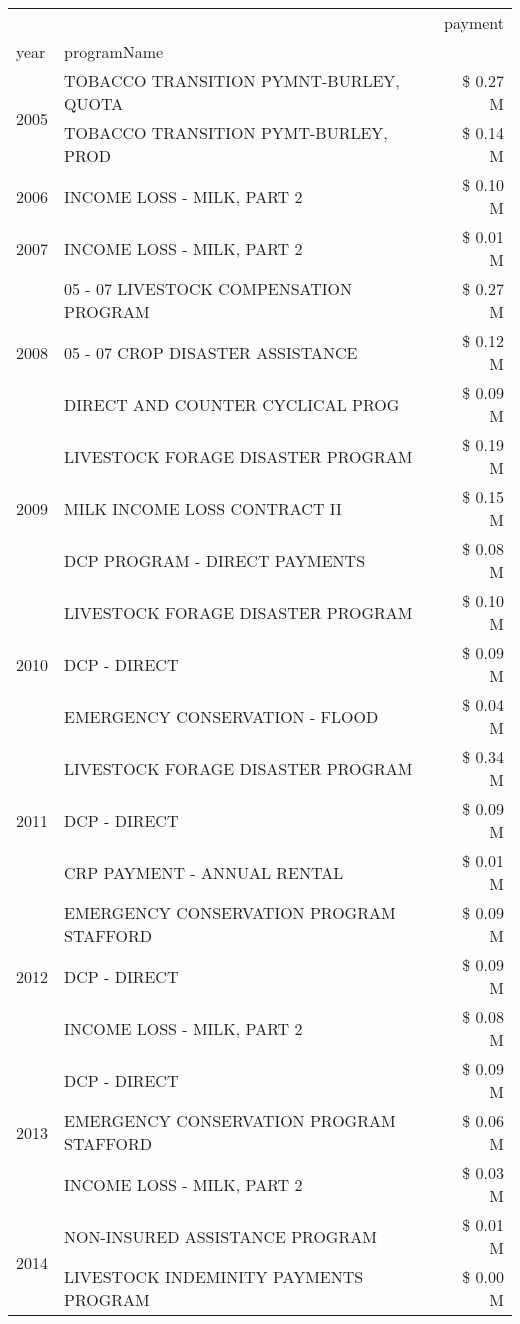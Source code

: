 \begin{tabular}{llr}
\toprule
 &  & payment \\
year & programName &  \\
\midrule
\multirow[t]{2}{*}{2005} & TOBACCO TRANSITION PYMNT-BURLEY, QUOTA & \$ 0.27 M \\
 & TOBACCO TRANSITION PYMT-BURLEY, PROD & \$ 0.14 M \\
\cline{1-3}
2006 & INCOME LOSS - MILK, PART 2 & \$ 0.10 M \\
\cline{1-3}
2007 & INCOME LOSS - MILK, PART 2 & \$ 0.01 M \\
\cline{1-3}
\multirow[t]{3}{*}{2008} & 05 - 07 LIVESTOCK COMPENSATION PROGRAM & \$ 0.27 M \\
 & 05 - 07 CROP DISASTER ASSISTANCE & \$ 0.12 M \\
 & DIRECT AND COUNTER CYCLICAL PROG & \$ 0.09 M \\
\cline{1-3}
\multirow[t]{3}{*}{2009} & LIVESTOCK FORAGE DISASTER  PROGRAM & \$ 0.19 M \\
 & MILK INCOME LOSS CONTRACT II & \$ 0.15 M \\
 & DCP PROGRAM - DIRECT PAYMENTS & \$ 0.08 M \\
\cline{1-3}
\multirow[t]{3}{*}{2010} & LIVESTOCK FORAGE DISASTER PROGRAM & \$ 0.10 M \\
 & DCP - DIRECT & \$ 0.09 M \\
 & EMERGENCY CONSERVATION - FLOOD & \$ 0.04 M \\
\cline{1-3}
\multirow[t]{3}{*}{2011} & LIVESTOCK FORAGE DISASTER PROGRAM & \$ 0.34 M \\
 & DCP - DIRECT & \$ 0.09 M \\
 & CRP PAYMENT - ANNUAL RENTAL & \$ 0.01 M \\
\cline{1-3}
\multirow[t]{3}{*}{2012} & EMERGENCY CONSERVATION PROGRAM STAFFORD & \$ 0.09 M \\
 & DCP - DIRECT & \$ 0.09 M \\
 & INCOME LOSS - MILK, PART 2 & \$ 0.08 M \\
\cline{1-3}
\multirow[t]{3}{*}{2013} & DCP - DIRECT & \$ 0.09 M \\
 & EMERGENCY CONSERVATION PROGRAM STAFFORD & \$ 0.06 M \\
 & INCOME LOSS - MILK, PART 2 & \$ 0.03 M \\
\cline{1-3}
\multirow[t]{3}{*}{2014} & NON-INSURED ASSISTANCE PROGRAM & \$ 0.01 M \\
 & LIVESTOCK INDEMINITY PAYMENTS PROGRAM & \$ 0.00 M \\

\end{tabular}

